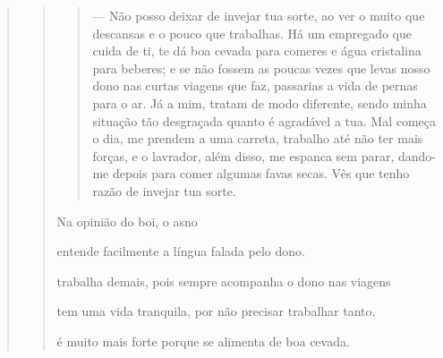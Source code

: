 \begin{escolha}
\begin{escolha}
\begin{escolha}
\begin{quote}
\begin{quote}
{\begin{quote}
--- Não posso deixar de invejar tua sorte, ao ver o muito que descansas e
o pouco que trabalhas. Há um empregado que cuida de ti, te dá boa cevada
para comeres e água cristalina para beberes; e se não fossem as poucas
vezes que levas nosso dono nas curtas viagens que faz, passarias a vida
de pernas para o ar. Já a mim, tratam de modo diferente, sendo minha
situação tão desgraçada quanto é agradável a tua. Mal começa o dia, me
prendem a uma carreta, trabalho até não ter mais forças, e o lavrador,
além disso, me espanca sem parar, dando-me depois para comer algumas
favas secas. Vês que tenho razão de invejar tua sorte.
\end{quote}


Na opinião do boi, o asno

\begin{escolha}
\item entende facilmente a língua falada pelo dono.

\item trabalha demais, pois sempre acompanha o dono nas viagens

\item tem uma vida tranquila, por não precisar trabalhar tanto.

\item é muito mais forte porque se alimenta de boa cevada.
\end{escolha}


}
\end{quote}
\end{quote}
\end{escolha}
\end{escolha}
\end{escolha}
